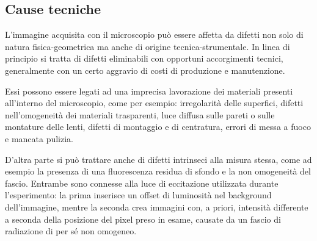 \subsection {Cause tecniche} 

L'immagine acquisita con il microscopio può essere affetta da difetti non solo di natura fisica-geometrica ma anche di origine tecnica-strumentale. 
In linea di principio si tratta di difetti eliminabili con opportuni accorgimenti tecnici, generalmente con un certo aggravio di costi di produzione e manutenzione.

Essi possono essere legati ad una imprecisa lavorazione dei materiali presenti all'interno del microscopio, come per esempio: irregolarità delle superfici, difetti nell'omogeneità dei materiali trasparenti, luce diffusa sulle pareti o sulle montature delle lenti, difetti di montaggio e di centratura, errori di messa a fuoco e mancata pulizia.

D'altra parte si può trattare anche di difetti intrinseci alla misura stessa, come ad esempio la presenza di una fluorescenza residua di sfondo e la non omogeneità del fascio. 
Entrambe sono connesse alla luce di eccitazione utilizzata durante l'esperimento: la prima inserisce un offset di luminosità nel background dell'immagine, mentre la seconda crea immagini con, a priori, intensità differente a seconda della posizione del pixel preso in esame, causate da un fascio di radiazione di per sé non omogeneo.

